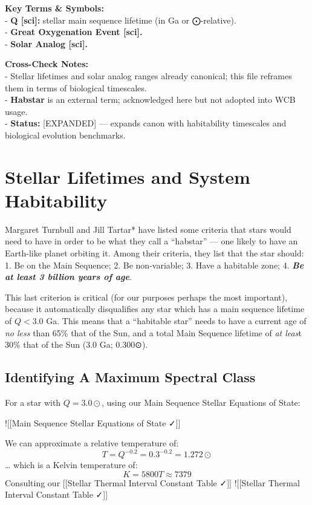 \documentclass[
  letterpaper,
]{book}
\begin{document}
\textbf{Key Terms \& Symbols:}\\
- \textbf{Q {[}sci{]}:} stellar main sequence lifetime (in Ga or
⨀-relative).\\
- \textbf{Great Oxygenation Event {[}sci{]}.}\\
- \textbf{Solar Analog {[}sci{]}.}

\textbf{Cross-Check Notes:}\\
- Stellar lifetimes and solar analog ranges already canonical; this file
reframes them in terms of biological timescales.\\
- \textbf{Habstar} is an external term; acknowledged here but not
adopted into WCB usage.\\
- \textbf{Status:} {[}EXPANDED{]} --- expands canon with habitability
timescales and biological evolution benchmarks.

\chapter{Stellar Lifetimes and System
Habitability}\label{stellar-lifetimes-and-system-habitability}

Margaret Turnbull and Jill Tartar* have listed some criteria that stars
would need to have in order to be what they call a ``habstar'' --- one
likely to have an Earth-like planet orbiting it. Among their criteria,
they list that the star should: 1. Be on the Main Sequence; 2. Be
non-variable; 3. Have a habitable zone; 4. \textbf{\emph{Be at least 3
billion years of age}}.

This last criterion is critical (for our purposes perhaps the most
important), because it automatically disqualifies any star which has a
main sequence lifetime of \(Q < 3.0\) Ga. This means that a ``habitable
star'' needs to have a current age of \emph{no less} than 65\% that of
the Sun, and a total Main Sequence lifetime of \emph{at leas}t 30\% that
of the Sun (\(3.0\) Ga; \(0.300\)⊙).

\section{Identifying A Maximum Spectral
Class}\label{identifying-a-maximum-spectral-class}

For a star with \(Q = 3.0⊙\), using our Main Sequence Stellar Equations
of State:

!{[}{[}Main Sequence Stellar Equations of State ✓{]}{]}

We can approximate a relative temperature of: \[
T = Q^{-0.2} = 0.3^{-0.2} = 1.272⊙
\] \ldots{} which is a Kelvin temperature of: \[
K = 5800T \approx 7379
\] Consulting our {[}{[}Stellar Thermal Interval Constant Table ✓{]}{]}
!{[}{[}Stellar Thermal Interval Constant Table ✓{]}{]}
\end{document}
